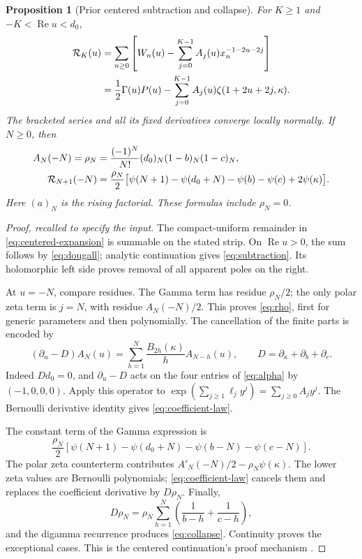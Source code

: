 \documentclass[11pt,a4paper]{article}
\numberwithin{equation}{section}
\newtheorem{proposition}[theorem]{Proposition}
\theoremstyle{definition}\newtheorem{definition}[theorem]{Definition}
\theoremstyle{remark}\newtheorem{remark}[theorem]{Remark}
\newcommand{\Repart}{\operatorname{Re}}
\begin{document}
\begin{proposition}[Prior centered subtraction and collapse]
\label{prop:prior}
For $K\ge1$ and $-K<\Repart u<d_0$,
\begin{align}
 \mathcal R_K(u)&=\sum_{n\ge0}\left[
 W_n(u)-\sum_{j=0}^{K-1}A_j(u)x_n^{-1-2u-2j}\right]\notag\\
 &=\frac12\Gamma(u)P(u)-\sum_{j=0}^{K-1}
                   A_j(u)\zeta(1+2u+2j,\kappa).
 \label{eq:subtraction}
\end{align}
The bracketed series and all its fixed derivatives converge locally
normally. If $N\ge0$, then
\begin{align}
 A_N(-N)=\rho_N
 &=\frac{(-1)^N}{N!}(d_0)_N(1-b)_N(1-c)_N,\label{eq:rho}\\
 \mathcal R_{N+1}(-N)
 &=\frac{\rho_N}{2}\bigl[\psi(N+1)-\psi(d_0+N)
              -\psi(b)-\psi(c)+2\psi(\kappa)\bigr].\label{eq:collapse}
\end{align}
Here $(a)_N$ is the rising factorial. These formulas include $\rho_N=0$.
\end{proposition}
\begin{proof}[Proof, recalled to specify the input]
The compact-uniform remainder in \eqref{eq:centered-expansion} is
summable on the stated strip. On $\Repart u>0$, the sum follows by
\eqref{eq:dougall}; analytic continuation gives
\eqref{eq:subtraction}. Its holomorphic left side proves removal of
all apparent poles on the right.

At $u=-N$, compare residues. The Gamma term has residue $\rho_N/2$;
the only polar zeta term is $j=N$, with residue $A_N(-N)/2$.
This proves \eqref{eq:rho}, first for generic parameters and then
polynomially. The cancellation of the finite parts is encoded by
\begin{equation}
 (\partial_u-D)A_N(u)=\sum_{h=1}^N\frac{B_{2h}(\kappa)}h A_{N-h}(u),
 \qquad D=\partial_\kappa+\partial_b+\partial_c.
 \label{eq:coefficient-law}
\end{equation}
Indeed $Dd_0=0$, and $\partial_u-D$ acts on the four entries of
\eqref{eq:alpha} by $(-1,0,0,0)$. Apply this operator to
$\exp(\sum_{j\ge1}\ell_j y^j)=\sum_{j\ge0}A_jy^j$.
The Bernoulli derivative identity gives \eqref{eq:coefficient-law}.

The constant term of the Gamma expression is
\[
 \frac{\rho_N}{2}
 [\psi(N+1)-\psi(d_0+N)-\psi(b-N)-\psi(c-N)].
\]
The polar zeta counterterm contributes
$A'_N(-N)/2-\rho_N\psi(\kappa)$. The lower zeta values are
Bernoulli polynomials; \eqref{eq:coefficient-law} cancels them and
replaces the coefficient derivative by $D\rho_N$. Finally,
\[
 D\rho_N=\rho_N\sum_{h=1}^N
              \left(\frac1{b-h}+\frac1{c-h}\right),
\]
and the digamma recurrence produces \eqref{eq:collapse}.
Continuity proves the exceptional cases. This is the centered
continuation's proof mechanism \cite{repo-centered}.
\end{proof}
\end{document}
